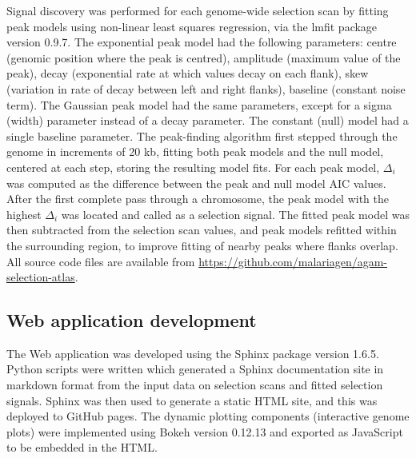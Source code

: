 \documentclass[a4paper,11pt,abstracton,hidelinks]{scrartcl}
\begin{document}
Signal discovery was performed for each genome-wide selection scan by fitting peak models using non-linear least squares regression, via the lmfit package version 0.9.7.
%
The exponential peak model had the following parameters: centre (genomic position where the peak is centred), amplitude (maximum value of the peak), decay (exponential rate at which values decay on each flank), skew (variation in rate of decay between left and right flanks), baseline (constant noise term).
%
The Gaussian peak model had the same parameters, except for a sigma (width) parameter instead of a decay parameter.
%
The constant (null) model had a single baseline parameter.
%
The peak-finding algorithm first stepped through the genome in increments of 20 kb, fitting both peak models and the null model, centered at each step, storing the resulting model fits.
%
For each peak model, $\Delta_i$ was computed as the difference between the peak and null model AIC values.
%
After the first complete pass through a chromosome, the peak model with the highest $\Delta_i$ was located and called as a selection signal.
%
The fitted peak model was then subtracted from the selection scan values, and peak models refitted within the surrounding region, to improve fitting of nearby peaks where flanks overlap.
%
All source code files are available from \url{https://github.com/malariagen/agam-selection-atlas}.


\subsection{Web application development}\label{subsec:methods-webapp}


The Web application was developed using the Sphinx package version 1.6.5.
%
Python scripts were written which generated a Sphinx documentation site in markdown format from the input data on selection scans and fitted selection signals.
%
Sphinx was then used to generate a static HTML site, and this was deployed to GitHub pages.
%
The dynamic plotting components (interactive genome plots) were implemented using Bokeh version 0.12.13 and exported as JavaScript to be embedded in the HTML.


\printbibliography


\clearpage
\beginsupplement
\end{document}
